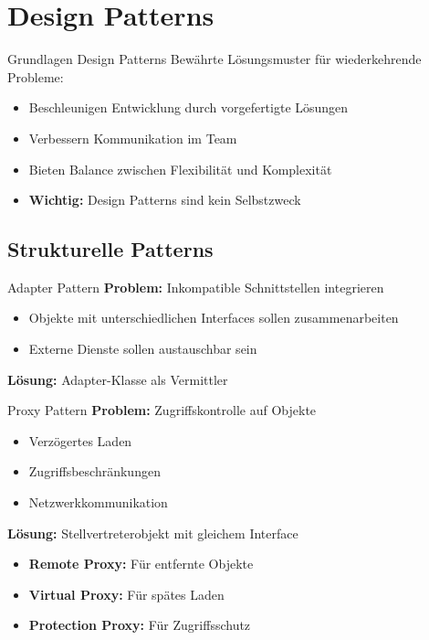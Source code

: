 \section{Design Patterns}

\begin{concept}{Grundlagen Design Patterns}
Bewährte Lösungsmuster für wiederkehrende Probleme:
\begin{itemize}
    \item Beschleunigen Entwicklung durch vorgefertigte Lösungen
    \item Verbessern Kommunikation im Team
    \item Bieten Balance zwischen Flexibilität und Komplexität
    \item \textbf{Wichtig:} Design Patterns sind kein Selbstzweck
\end{itemize}
\end{concept}

\subsection{Strukturelle Patterns}

\begin{definition}{Adapter Pattern}
\textbf{Problem:} Inkompatible Schnittstellen integrieren
\begin{itemize}
    \item Objekte mit unterschiedlichen Interfaces sollen zusammenarbeiten
    \item Externe Dienste sollen austauschbar sein
\end{itemize}
\textbf{Lösung:} Adapter-Klasse als Vermittler
\end{definition}

\begin{definition}{Proxy Pattern}
\textbf{Problem:} Zugriffskontrolle auf Objekte
\begin{itemize}
    \item Verzögertes Laden
    \item Zugriffsbeschränkungen
    \item Netzwerkkommunikation
\end{itemize}
\textbf{Lösung:} Stellvertreterobjekt mit gleichem Interface
\begin{itemize}
    \item \textbf{Remote Proxy:} Für entfernte Objekte
    \item \textbf{Virtual Proxy:} Für spätes Laden
    \item \textbf{Protection Proxy:} Für Zugriffsschutz
\end{itemize}
\end{definition}

